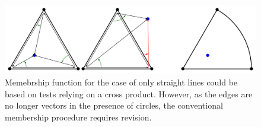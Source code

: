 \begin{figure} %
    \centering
    \includegraphics[width=1.\textwidth]{figures/intro_crossProdFail.png}
    \caption{Memebrship function for the case of only straight lines could be based on tests relying on a cross product.
    However, as the edges are no longer vectors in the presence of circles, the conventional membership procedure requires revision.}
    \label{fig:intro_crossProdFail}
\end{figure}





